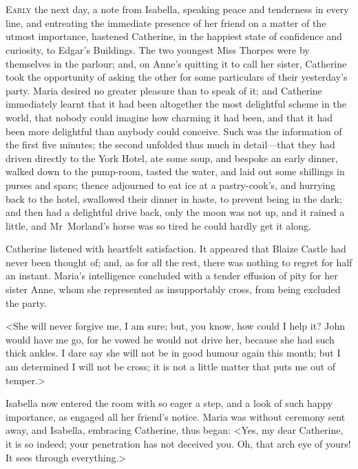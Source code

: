 \chapter[Chapter \thechapter]{} 

 \lettrine{E}{arly} the next day, a note from Isabella, speaking peace and tenderness in every line, and entreating the immediate presence of her friend on a matter of the utmost importance, hastened Catherine, in the happiest state of confidence and curiosity, to Edgar's Buildings. The two youngest Miss Thorpes were by themselves in the parlour; and, on Anne's quitting it to call her sister, Catherine took the opportunity of asking the other for some particulars of their yesterday's party. Maria desired no greater pleasure than to speak of it; and Catherine immediately learnt that it had been altogether the most delightful scheme in the world, that nobody could imagine how charming it had been, and that it had been more delightful than anybody could conceive. Such was the information of the first five minutes; the second unfolded thus much in detail—that they had driven directly to the York Hotel, ate some soup, and bespoke an early dinner, walked down to the pump-room, tasted the water, and laid out some shillings in purses and spars; thence adjourned to eat ice at a pastry-cook's, and hurrying back to the hotel, swallowed their dinner in haste, to prevent being in the dark; and then had a delightful drive back, only the moon was not up, and it rained a little, and Mr~Morland's horse was so tired he could hardly get it along. 

 Catherine listened with heartfelt satisfaction. It appeared that Blaize Castle had never been thought of; and, as for all the rest, there was nothing to regret for half an instant. Maria's intelligence concluded with a tender effusion of pity for her sister Anne, whom she represented as insupportably cross, from being excluded the party. 

 <She will never forgive me, I am sure; but, you know, how could I help it? John would have me go, for he vowed he would not drive her, because she had such thick ankles. I dare say she will not be in good humour again this month; but I am determined I will not be cross; it is not a little matter that puts me out of temper.> 

 Isabella now entered the room with so eager a step, and a look of such happy importance, as engaged all her friend's notice. Maria was without ceremony sent away, and Isabella, embracing Catherine, thus began: <Yes, my dear Catherine, it is so indeed; your penetration has not deceived you. Oh, that arch eye of yours! It sees through everything.> 

